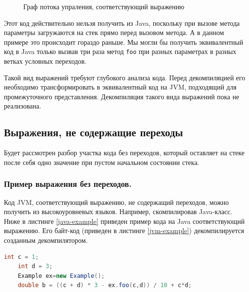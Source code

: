 \begin{figure} [h]
\caption{Граф потока упраления, соответствующий выражению}\label{graph}
\end{figure}

Этот код действительно нельзя получить из Java, поскольку при вызове метода параметры загружаются на стек прямо перед вызовом метода. 
А в данном примере это происходит гораздо раньше. Мы могли бы получить эквивалентный код в Java только вызвав три раза метод \texttt{foo} при разных 
параметрах в разных ветках условных переходов. 

Такой вид выражений требуют глубокого анализа кода. Перед декомпиляцией его необходимо трансформировать в эквивалентный код на JVM, подходящий для промежуточного 
представления. Декомпиляция такого вида выражений пока не реализована. 

\subsection{Выражения, не содержащие переходы}
Будет рассмотрен разбор участка кода без переходов, который оставляет на стеке после себя одно значение при пустом начальном состоянии стека. 

\subsubsection{Пример выражения без переходов.}

Код JVM, соответствующий выражению, не содержащий переходов, можно получить из высокоуровневых языков. Например, скомпилировав Java-класс. 
Ниже в листинге \ref{java-example} приведен пример кода на Java соответствующий выражению. Его байт-код (приведен в листинге \ref{jvm-example}) декомпилируется созданным декомпилятором. 

\begin{lstlisting}[label=java-example,caption = Пример кода выражения в Java без переходов, frame = single, language = JAVA]
	int c = 1; 
 	int d = 3; 
	Example ex=new Example();
 	double b = ((c + d) * 3 - ex.foo(c,d)) / 10 + c*d; 
\end{lstlisting}

